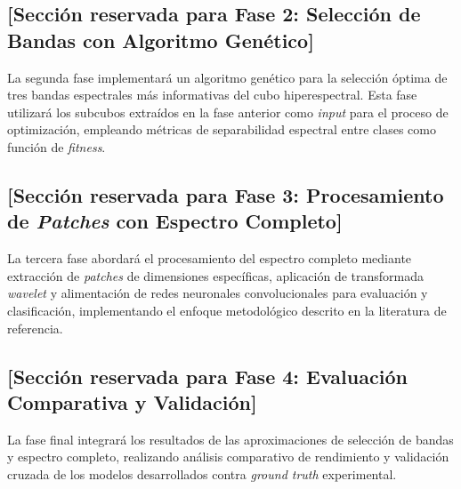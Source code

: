 \subsection{[Sección reservada para Fase 2: Selección de Bandas con Algoritmo Genético]}

La segunda fase implementará un algoritmo genético para la selección óptima de tres bandas espectrales más informativas del cubo hiperespectral. Esta fase utilizará los subcubos extraídos en la fase anterior como \emph{input} para el proceso de optimización, empleando métricas de separabilidad espectral entre clases como función de \emph{fitness}.

\subsection{[Sección reservada para Fase 3: Procesamiento de \emph{Patches} con Espectro Completo]}

La tercera fase abordará el procesamiento del espectro completo mediante extracción de \emph{patches} de dimensiones específicas, aplicación de transformada \emph{wavelet} y alimentación de redes neuronales convolucionales para evaluación y clasificación, implementando el enfoque metodológico descrito en la literatura de referencia.

\subsection{[Sección reservada para Fase 4: Evaluación Comparativa y Validación]}

La fase final integrará los resultados de las aproximaciones de selección de bandas y espectro completo, realizando análisis comparativo de rendimiento y validación cruzada de los modelos desarrollados contra \emph{ground truth} experimental.
